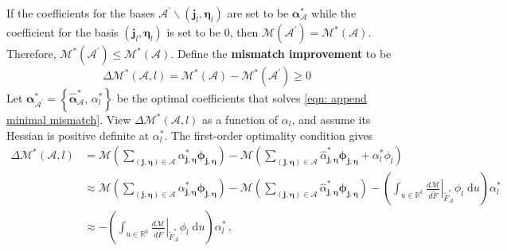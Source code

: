 If the coefficients for the bases $\mathcal{A}^\prime\backslash (\boldsymbol{j}_l, \boldsymbol{\eta}_l)$
are set to be $\boldsymbol{\alpha}^*_{\mathcal{A}}$ while the coefficient for the basis
$(\boldsymbol{j}_l, \boldsymbol{\eta}_l)$ is set to be $0$, then 
$\mathcal{M}(\mathcal{A}^\prime) = \mathcal{M}^*(\mathcal{A})$. 
Therefore, $\mathcal{M}^*(\mathcal{A}^\prime) \le \mathcal{M}^*(\mathcal{A})$. 
Define the \textbf{mismatch improvement} to be
\begin{equation}
    \Delta \mathcal{M}^*\left(\mathcal{A}, l\right) = \mathcal{M}^*(\mathcal{A}) - 
    \mathcal{M}^*(\mathcal{A}^\prime)\ge 0
    \label{eqn: mismatch improvement}
\end{equation} 
Let $\boldsymbol{\alpha}^*_{\mathcal{A}^\prime} = \left\{
\hat{\boldsymbol{\alpha}}^*_{\mathcal{A}}, \, \alpha_l^*
\right\}$ be the optimal coefficients that solves \eqref{eqn: append minimal mismatch}.
View $\Delta \mathcal{M}^*\left(\mathcal{A}, l\right)$ as a function of $\alpha_l$,
and assume its Hessian is positive definite at 
$\alpha_l^*$. The first-order optimality condition gives
\begin{equation}\begin{split}
    \Delta\mathcal{M}^*\left(\mathcal{A}, l\right) &
    = \mathcal{M} \left( 
    \sum_{(\boldsymbol{j}, \boldsymbol{\eta}) \in \mathcal{A}}
    \alpha^*_{\boldsymbol{j}, \boldsymbol{\eta}} \boldsymbol{\phi}_{\boldsymbol{j}, \boldsymbol{\eta}}
    \right)
    - \mathcal{M} \left( 
    \sum_{(\boldsymbol{j}, \boldsymbol{\eta}) \in \mathcal{A}}
    \hat{\alpha}^*_{\boldsymbol{j}, \boldsymbol{\eta}} 
    \boldsymbol{\phi}_{\boldsymbol{j}, \boldsymbol{\eta}}
    + \alpha_l^* \phi_l
    \right)\\
    &\approx 
    \mathcal{M} \left(
    \sum_{(\boldsymbol{j}, \boldsymbol{\eta}) \in \mathcal{A}}
    \alpha^*_{\boldsymbol{j}, \boldsymbol{\eta}} \boldsymbol{\phi}_{\boldsymbol{j}, \boldsymbol{\eta}}
    \right) 
    - \mathcal{M} \left( 
    \sum_{(\boldsymbol{j}, \boldsymbol{\eta}) \in \mathcal{A}}
    \hat{\alpha}^*_{\boldsymbol{j}, \boldsymbol{\eta}} 
    \boldsymbol{\phi}_{\boldsymbol{j}, \boldsymbol{\eta}}
    \right)
    -\left(\int_{u\in \mathbb{R}^k} \left.\frac{d\mathcal{M}}{d \tilde{F}}
    \right|_{\tilde{F}_\mathcal{A}^*} \phi_l
    \; \textrm{d} u \right) \alpha_l^*\\
    &\approx -\left(\int_{u\in \mathbb{R}^k} \left.\frac{d\mathcal{M}}{d \tilde{F}}
    \right|_{\tilde{F}_\mathcal{A}^*} \phi_l
    \; \textrm{d} u \right) \alpha_l^* \,,
    \label{eqn: taylor expansion}
\end{split}\end{equation}
